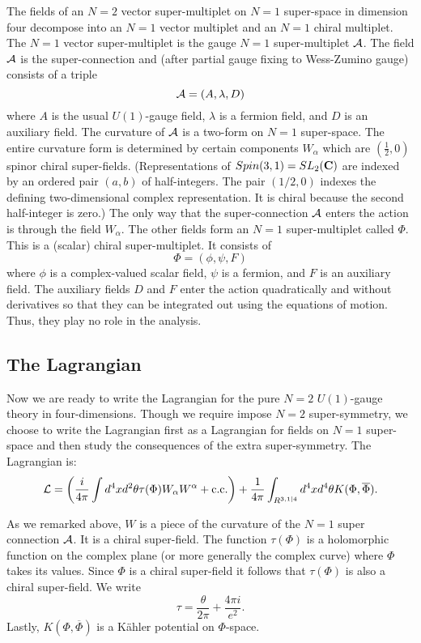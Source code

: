 \documentclass[10pt]{article}
\begin{document}
The fields of an $N=2$ vector super-multiplet  on $N=1$
super-space in dimension four decompose into an $N=1$ vector multiplet
and an $N=1$ chiral multiplet.
The $N=1$ vector super-multiplet is the gauge $N=1$
super-multiplet ${\cal A}$.
 The field ${\cal A}$ is the super-connection and (after partial gauge
fixing to Wess-Zumino gauge) consists of a triple 
$${\cal A}=(A,\lambda,D)$$
where $A$ is the usual $U(1)$-gauge field, $\lambda$ is a fermion
field, and $D$ is an auxiliary field.
The curvature of ${\cal A}$ is a two-form on $N=1$
super-space. The entire curvature form is determined by certain
components $W_\alpha$ which are
 $(\frac{1}{2},0)$ spinor chiral super-fields. (Representations of
$Spin(3,1)=SL_2({\bf C})$ are indexed by an ordered pair $(a,b)$ of
half-integers. The pair $(1/2,0)$ indexes the defining two-dimensional
complex representation.  It is 
chiral because the second half-integer is zero.) The only way that the
super-connection  ${\cal
A}$ enters the action is through the field $W_\alpha$.
The other fields  form an $N=1$ super-multiplet called $\Phi$.
This is a (scalar) chiral super-multiplet. 
It consists of
$$\Phi=(\phi,\psi,F)$$
where $\phi$ is a complex-valued scalar field,
$\psi$ is a fermion, and $F$ is an auxiliary field.  The auxiliary
fields $D$ and $F$ enter the action quadratically and without
derivatives so that 
they can be integrated out using the equations of motion.
Thus, they play no role in the analysis.

\subsection{The Lagrangian}

Now we are ready to write the Lagrangian for the pure $N=2$
$U(1)$-gauge theory in four-dimensions.  Though we
require impose $N=2$ super-symmetry, we choose to write the Lagrangian
first as a Lagrangian for fields on $N=1$ super-space and then study the
consequences of the extra super-symmetry. The Lagrangian is:
\begin{equation}\label{1steqn}
{\cal L}=\left(\frac{i}{4\pi}\int d^4xd^2
\theta\tau(\Phi)W_\alpha W^\alpha+{\rm c.c.}\right)
+\frac{1}{4\pi}\int_{R^{3,1|4}}d^4xd^4\theta K(\Phi,\overline\Phi).
\end{equation}

As we remarked above, $W$ is a piece of the curvature of the $N=1$ super
connection ${\cal A}$.  It 
is a chiral super-field. The function $\tau(\Phi)$ is a holomorphic
function on the complex plane (or more generally the complex curve)
where $\Phi$ takes its values.  Since 
$\Phi$ is a chiral super-field it follows  that 
$\tau(\Phi)$ is also a chiral super-field.
We write
$$\tau=\frac{\theta}{2\pi}+\frac{4\pi i}{e^2}.$$
 Lastly,
$K(\Phi,\overline\Phi)$ is a K\"ahler potential on $\Phi$-space.
\end{document}

